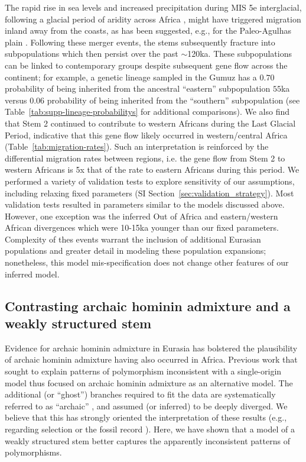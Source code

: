\documentclass[]{article}
\begin{document}
The rapid rise in sea levels and increased precipitation during MIS
5e interglacial, following a glacial period of aridity across Africa
\citep{Blome2012-lw}, might have triggered migration inland away from the
coasts, as has been suggested, e.g., for the Paleo-Agulhas plain
\citep{Marean2014-pg}. Following these merger events, the stems subsequently fracture into
subpopulations which then persist over the past $\sim$120ka. These
subpopulations can be linked to contemporary groups despite subsequent gene
flow across the continent; for example, a genetic lineage sampled in the Gumuz
has a $0.70$ probability of being inherited from the ancestral ``eastern''
subpopulation $55$ka versus $0.06$ probability of being inherited
from the ``southern'' subpopulation (see Table~\ref{tab:supp-lineage-probabilitys} for
additional comparisons). We also find that Stem 2 continued to contribute to
western Africans during the Last Glacial Period, indicative that this gene flow
likely occurred in western/central Africa (Table~\ref{tab:migration-rates}).
Such an interpretation is reinforced by the differential migration rates
between regions, i.e. the gene flow from Stem 2 to western Africans is 5x that
of the rate to eastern Africans during this period. We performed a variety of
validation tests to explore sensitivity of our assumptions, including relaxing
fixed parameters (SI Section~\ref{sec:validation_strategy}). Most validation
tests resulted in parameters similar to the models discussed above. However,
one exception was the inferred Out of Africa and eastern/western African
divergences which were 10-15ka younger than our fixed parameters. Complexity of
thes events warrant the inclusion of additional Eurasian populations and
greater detail in modeling these population expansions; nonetheless, this model
mis-specification does not change other features of our inferred model.

\subsection*{Contrasting archaic hominin admixture and a weakly structured stem}

Evidence for archaic hominin admixture in Eurasia has bolstered the
plausibility of archaic hominin admixture having also occurred in Africa.
Previous work that sought to explain patterns of polymorphism inconsistent with
a single-origin model thus focused on archaic hominin admixture as an
alternative model. The additional (or ``ghost'') branches required to fit the
data are systematically referred to as ``archaic''
\citep{Plagnol2006-lt,Hammer2011-bx,Hey2018-pw,Ragsdale2019-nt,
Lorente-Galdos2019-vz,Durvasula2020-td}, and assumed (or inferred) to be deeply
diverged. We believe that this has strongly oriented the interpretation of
these results (e.g., regarding selection \cite{Wall2019-ao} or the fossil
record \cite{Grun2020-su}). Here, we have shown that a model of a weakly
structured stem better captures the apparently inconsistent patterns of
polymorphisms.
\end{document}
